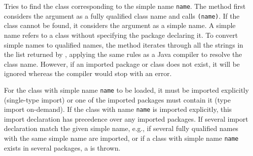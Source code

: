 \begin{tabb}   Tries to find the class corresponding to the simple
 name \texttt{name}.  The method first considers
 the argument as a fully qualified class name
 and calls  \texttt{(name)}.
 If the class cannot be found, it considers the argument
 as a simple name.  A simple name refers to a class without
 specifying the package declaring it.  To convert
 simple names to qualified names, the method iterates through
 all the strings in the list returned by ,
 applying
 the same rules as a Java compiler to resolve
 the class name.  However, if an imported package or
 class does not exist, it will be ignored whereas
 the compiler would stop with an error.

 For the class with simple name \texttt{name} to
 be loaded, it must be imported explicitly (single-type import) or
 one of the imported packages must contain it (type import on-demand).
 If the class with name \texttt{name} is imported explicitly,
 this import declaration has precedence over
 any imported packages.
 If several import declaration match the given simple
 name, e.g., if several fully qualified names with the same
 simple name are imported, or if a class with simple
 name \texttt{name} exists in several packages,
 a  is thrown.
\end{tabb}
\begin{htmlonly}
\end{htmlonly}
